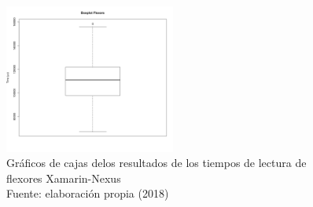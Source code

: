 \begin{figure}[H]
  \begin{center} 
   	\includegraphics[width=0.5\textwidth]{evaluation/graphics/Xamarin/Nexus/BoxplotFlexorsXamarinNexus.png} 
   	\captionsetup{justification=centering}
    \caption[Gráficos de cajas de los resultados de los tiempos de lectura de flexores Xamarin-Nexus]{Gráficos de cajas delos resultados de los tiempos de lectura de  flexores Xamarin-Nexus\\Fuente: elaboración propia (2018)} 
    \label{fig:xamarin-nexus-boxplot-flexors}
  \end{center}
\end{figure}
